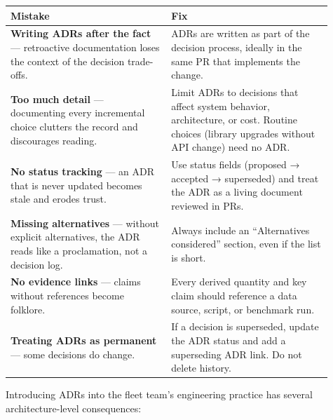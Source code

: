 \nopagebreak[4]
\begin{longtable}[]{@{}
  >{\raggedright\arraybackslash}p{0.4527\linewidth}
  >{\raggedright\arraybackslash}p{0.4527\linewidth}@{}}
\toprule\noalign{}
\begin{minipage}[b]{\linewidth}\raggedright
Mistake
\end{minipage} & \begin{minipage}[b]{\linewidth}\raggedright
Fix
\end{minipage} \\
\midrule\noalign{}
\endhead
\bottomrule\noalign{}
\endlastfoot
\textbf{Writing ADRs after the fact} --- retroactive documentation loses
the context of the decision trade-offs. & ADRs are written as part of
the decision process, ideally in the same PR that implements the
change. \\
\noalign{\label{tab:25.1}}
\textbf{Too much detail} --- documenting every incremental choice
clutters the record and discourages reading. & Limit ADRs to decisions
that affect system behavior, architecture, or cost. Routine choices
(library upgrades without API change) need no ADR. \\
\textbf{No status tracking} --- an ADR that is never updated becomes
stale and erodes trust. & Use status fields (proposed → accepted →
superseded) and treat the ADR as a living document reviewed in PRs. \\
\textbf{Missing alternatives} --- without explicit alternatives, the ADR
reads like a proclamation, not a decision log. & Always include an
``Alternatives considered'' section, even if the list is short. \\
\textbf{No evidence links} --- claims without references become
folklore. & Every derived quantity and key claim should reference a data
source, script, or benchmark run. \\
\textbf{Treating ADRs as permanent} --- some decisions do change. & If a
decision is superseded, update the ADR status and add a superseding ADR
link. Do not delete history. \\
\end{longtable}

\label{architecture-consequence}


Introducing ADRs into the fleet team's engineering practice has several
architecture-level consequences:

